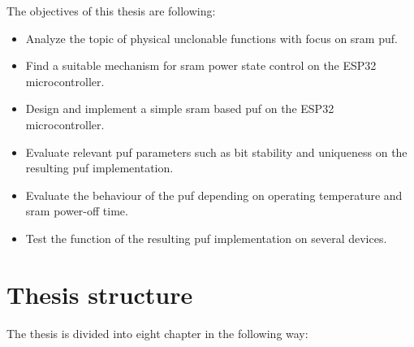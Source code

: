 The objectives of this thesis are following:

\begin{itemize}
    \item Analyze the topic of physical unclonable functions with focus on \gls{sram} \gls{puf}.
    \item Find a suitable mechanism for \gls{sram} power state control on the ESP32 microcontroller.
    \item Design and implement a simple \gls{sram} based \gls{puf} on the ESP32 microcontroller.
    \item Evaluate relevant \gls{puf} parameters such as bit stability and uniqueness on the resulting \gls{puf} implementation.
    \item Evaluate the behaviour of the \gls{puf} depending on operating temperature and \gls{sram} power-off time.
    \item Test the function of the resulting \gls{puf} implementation on several devices.
\end{itemize}

\section{Thesis structure}

The thesis is divided into eight chapter in the following way:

\newcommand\litem[1]{\item{\bfseries #1,\\}}

